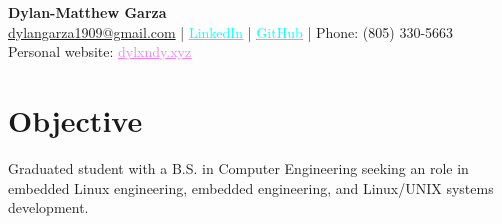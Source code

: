 \documentclass[letter,12pt]{article}
\begin{document}
\begin{center}
\textbf{\LARGE Dylan-Matthew Garza} \\[0.1cm]
\href{mailto:dylangarza1909@gmail.com}{dylangarza1909@gmail.com} |
  \href{https://www.linkedin.com/in/dylan-matthew-garza-094b021ba/}{\textcolor{cyan}{\underline{LinkedIn}}} |
  \href{https://github.com/DMGDy}{\textcolor{cyan}{\underline{GitHub}}} |
Phone: (805) 330-5663\\
  Personal website: \href{dylxndy.xyz}{\textcolor{violet}{\underline{dylxndy.xyz}}}
\end{center}

\vspace{-1.5cm}
\section*{Objective}
Graduated student with a B.S. in Computer Engineering seeking an 
role in embedded Linux engineering, embedded engineering, and Linux/UNIX systems 
development.

\vspace{-.5cm}
\end{document}
